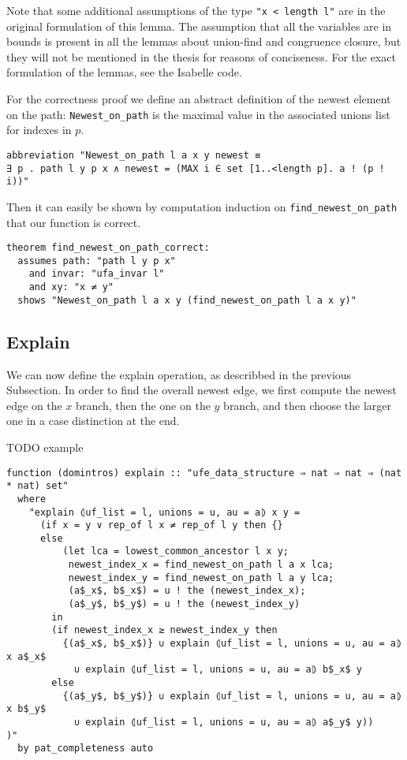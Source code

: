Note that some additional assumptions of the type \lstinline|"x < length l"| are in the original formulation of this lemma. The assumption that all the variables are in bounds is present in all the lemmas about union-find and congruence closure, but they will not be mentioned in the thesis for reasons of conciseness. For the exact formulation of the lemmas, see the Isabelle code.

For the correctness proof we define an abstract definition of the newest element on the path: \lstinline{Newest_on_path} is the maximal value in the associated unions list for indexes in $p$.

\begin{lstlisting}
abbreviation "Newest_on_path l a x y newest ≡
∃ p . path l y p x ∧ newest = (MAX i ∈ set [1..<length p]. a ! (p ! i))"
\end{lstlisting}

Then it can easily be shown by computation induction on \lstinline{find_newest_on_path} that our function is correct.

\begin{lstlisting}
theorem find_newest_on_path_correct:
  assumes path: "path l y p x"
    and invar: "ufa_invar l"
    and xy: "x ≠ y"
  shows "Newest_on_path l a x y (find_newest_on_path l a x y)"
\end{lstlisting}

\subsection{Explain}

We can now define the explain operation, as describbed in the previous Subsection.
In order to find the overall newest edge, we first compute the newest edge on the $x$ branch, then the one on the $y$ branch, and then choose the larger one in a case distinction at the end.

TODO example

\begin{lstlisting}
function (domintros) explain :: "ufe_data_structure ⇒ nat ⇒ nat ⇒ (nat * nat) set"
  where
    "explain ⦇uf_list = l, unions = u, au = a⦈ x y =
      (if x = y ∨ rep_of l x ≠ rep_of l y then {}
      else
          (let lca = lowest_common_ancestor l x y;
           newest_index_x = find_newest_on_path l a x lca;
           newest_index_y = find_newest_on_path l a y lca;
           (a$_x$, b$_x$) = u ! the (newest_index_x);
           (a$_y$, b$_y$) = u ! the (newest_index_y)
        in
        (if newest_index_x ≥ newest_index_y then
          {(a$_x$, b$_x$)} ∪ explain ⦇uf_list = l, unions = u, au = a⦈ x a$_x$
            ∪ explain ⦇uf_list = l, unions = u, au = a⦈ b$_x$ y
        else
          {(a$_y$, b$_y$)} ∪ explain ⦇uf_list = l, unions = u, au = a⦈ x b$_y$
            ∪ explain ⦇uf_list = l, unions = u, au = a⦈ a$_y$ y))
)"
  by pat_completeness auto
\end{lstlisting}

